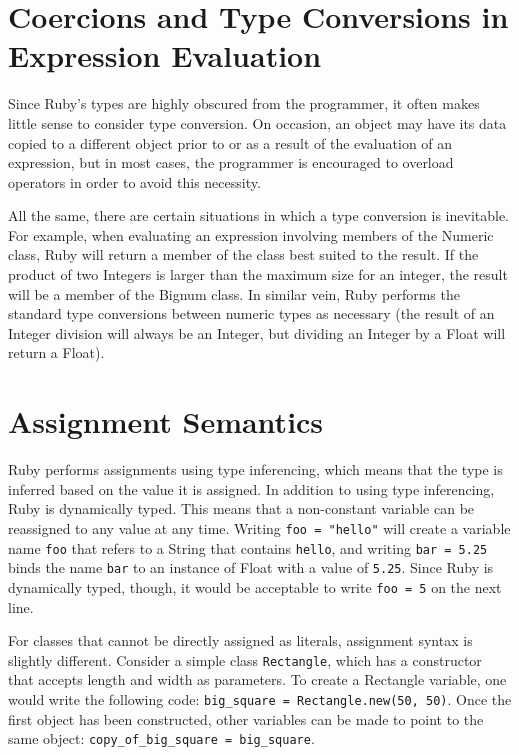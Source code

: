 \documentclass[12pt]{article}
\begin{document}
\section{Coercions and Type Conversions in Expression Evaluation}
Since Ruby's types are highly obscured from the programmer, it often makes little sense to consider type conversion. On occasion, an object may have its data copied to a different object prior to or as a result of the evaluation of an expression, but in most cases, the programmer is encouraged to overload operators in order to avoid this necessity.

All the same, there are certain situations in which a type conversion is inevitable. For example, when evaluating an expression involving members of the Numeric class, Ruby will return a member of the class best suited to the result. If the product of two Integers is larger than the maximum size for an integer, the result will be a member of the Bignum class\cite{docs_integer}. In similar vein, Ruby performs the standard type conversions between numeric types as necessary (the result of an Integer division will always be an Integer, but dividing an Integer by a Float will return a Float).

\section{Assignment Semantics}
Ruby performs assignments using type inferencing, which means that the type is inferred based on the value it is assigned. In addition to using type inferencing, Ruby is dynamically typed. This means that a non-constant variable can be reassigned to any value at any time. Writing \verb|foo = "hello"| will create a variable name \verb|foo| that refers to a String that contains \verb|hello|, and writing \verb|bar = 5.25| binds the name \verb|bar| to an instance of Float with a value of \verb|5.25|. Since Ruby is dynamically typed, though, it would be acceptable to write \verb|foo = 5| on the next line.

For classes that cannot be directly assigned as literals, assignment syntax is slightly different. Consider a simple class \verb|Rectangle|, which has a constructor that accepts length and width as parameters. To create a Rectangle variable, one would write the following code: \verb|big_square = Rectangle.new(50, 50)|. Once the first object has been constructed, other variables can be made to point to the same object: \verb|copy_of_big_square = big_square|\cite{learning_classes}.

\pagebreak
\nocite{*}

{}
\end{document}
